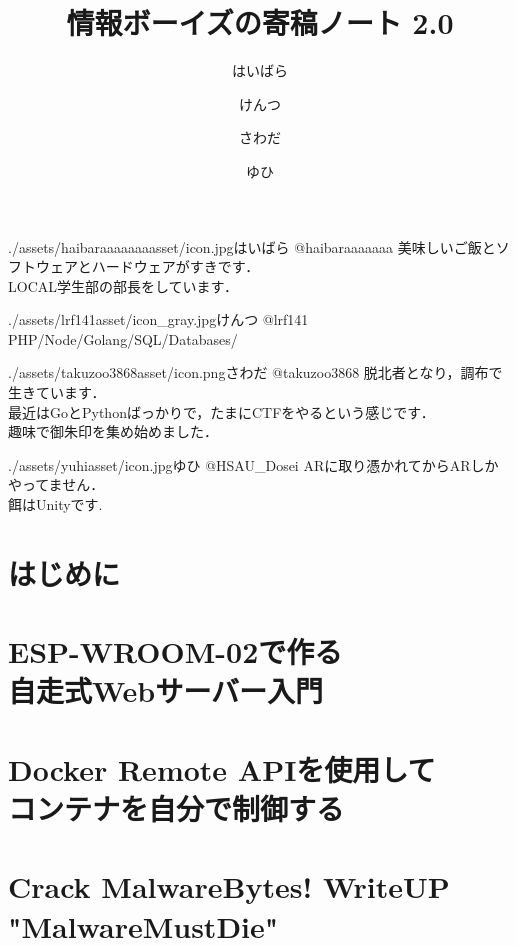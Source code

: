 \documentclass[autodetect-engine,dvipdfmx-if-dvi,ja=standard,b5paper,10.5pt,twoside,openany,layout=v2]{bxjsbook}
\title{情報ボーイズの寄稿ノート 2.0}
\author{はいばら \and けんつ \and さわだ \and ゆひ}
\date{}
\newcommand{\articlepath}{./articles}
\newcommand{\assetspath}{./assets}
\newcommand{\lrfasset}{\assetspath/lrf141asset}
\newcommand{\haibaraaaaaaaasset}{\assetspath/haibaraaaaaaaasset}
\newcommand{\yuhiasset}{\assetspath/yuhiasset}
\newcommand{\takuzooasset}{\assetspath/takuzoo3868asset}
\begin{document}
\frontmatter
\maketitle
\begin{myintroduce}{\haibaraaaaaaaasset/icon.jpg}{はいばら @haibaraaaaaaa}
  美味しいご飯とソフトウェアとハードウェアがすきです．\\
  LOCAL学生部の部長をしています．
\end{myintroduce}
\begin{myintroduce}{\lrfasset/icon_gray.jpg}{けんつ @lrf141}
  PHP/Node/Golang/SQL/Databases/
\end{myintroduce}
\begin{myintroduce}{\takuzooasset/icon.png}{さわだ @takuzoo3868}
脱北者となり，調布で生きています． \\
最近はGoとPythonばっかりで，たまにCTFをやるという感じです． \\
趣味で御朱印を集め始めました．
\end{myintroduce}
\begin{myintroduce}{\yuhiasset/icon.jpg}{ゆひ @HSAU_Dosei}
ARに取り憑かれてからARしかやってません． \\
餌はUnityです.
\end{myintroduce}

\chapter{はじめに}
\addtolength{\oddsidemargin}{10pt}
\addtolength{\evensidemargin}{-10pt}


\tableofcontents
\mainmatter

\chapter{ESP-WROOM-02で作る \\自走式Webサーバー入門}


\chapter{Docker Remote APIを使用して\\コンテナを自分で制御する}


\chapter{Crack MalwareBytes! WriteUP "MalwareMustDie"}
{\small

}
\end{document}
